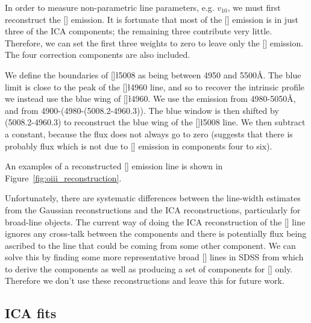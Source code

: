 In order to measure non-parametric line parameters, e.g. $v_{10}$, we must first reconstruct the [] emission. 
It is fortunate that most of the [] emission is in just three of the \ac{ICA} components; the remaining three contribute very little. 
Therefore, we can set the first three weights to zero to leave only the [] emission. 
The four correction components are also included. 

We define the boundaries of []\l5008 as being between 4950 and 5500\AA. 
The blue limit is close to the peak of the []\l4960 line, and so to recover the intrinsic profile we instead use the blue wing of []\l4960. 
We use the emission from 4980-5050\AA, and from 4900-(4980-(5008.2-4960.3)). 
The blue window is then shifted by (5008.2-4960.3) to reconstruct the blue wing of the []\l5008 line. 
We then subtract a constant, because the flux does not always go to zero (suggests that there is probably flux which is not due to [] emission in components four to six). 

An examples of a reconstructed [] emission line is shown in Figure~\ref{fig:oiii_reconstruction}. 

Unfortunately, there are systematic differences between the line-width estimates from the Gaussian reconstructions and the ICA reconstructions, particularly for broad-line objects.
The current way of doing the ICA reconstruction of the [] line ignores any cross-talk between the components and there is potentially flux being ascribed to the line that could be coming from some other component. 
We can solve this by finding some more representative broad [] lines in \ac{SDSS} from which to derive the components as well as producing a set of components for [] only.
Therefore we don't use these reconstructions and leave this for future work. 

\subsection{\ac{ICA} fits}

